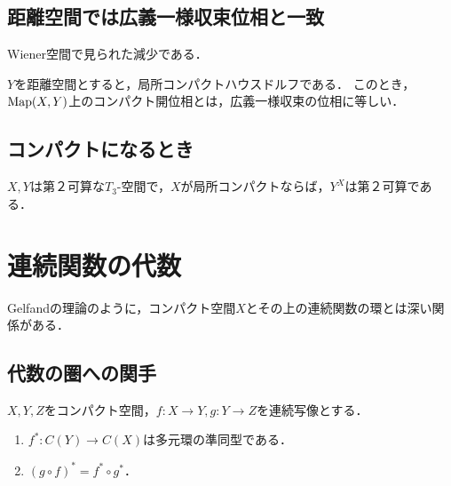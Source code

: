 \documentclass[uplatex,dvipdfmx]{jsreport}
\begin{document}
\subsection{距離空間では広義一様収束位相と一致}

\begin{tcolorbox}[colframe=ForestGreen, colback=ForestGreen!10!white,breakable,colbacktitle=ForestGreen!40!white,coltitle=black,fonttitle=\bfseries\sffamily,
title=]
    Wiener空間で見られた減少である．
\end{tcolorbox}

\begin{proposition}
    $Y$を距離空間とすると，局所コンパクトハウスドルフである．
    このとき，$\mathrm{Map}(X,Y)$上のコンパクト開位相とは，広義一様収束の位相に等しい．
\end{proposition}

\subsection{コンパクトになるとき}

\begin{proposition}
    $X,Y$は第２可算な$T_3$-空間で，$X$が局所コンパクトならば，$Y^X$は第２可算である．
\end{proposition}

\section{連続関数の代数}

\begin{tcolorbox}[colframe=ForestGreen, colback=ForestGreen!10!white,breakable,colbacktitle=ForestGreen!40!white,coltitle=black,fonttitle=\bfseries\sffamily,
title=]
    Gelfandの理論のように，コンパクト空間$X$とその上の連続関数の環とは深い関係がある．
\end{tcolorbox}

\subsection{代数の圏への関手}

\begin{theorem}
    $X,Y,Z$をコンパクト空間，$f:X\to Y,g:Y\to Z$を連続写像とする．
    \begin{enumerate}
        \item $f^*:C(Y)\to C(X)$は多元環の準同型である．
        \item $(g\circ f)^*=f^*\circ g^*$．
    \end{enumerate}
\end{theorem}
\end{document}
